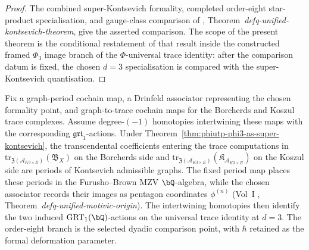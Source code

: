 \begin{proof}
The combined super-Kontsevich formality, completed order-eight
star-product specialisation, and gauge-class comparison of
\cite{VolI}, Theorem~\textit{defq-unified-kontsevich-theorem}, give
the asserted comparison. The scope of
the present theorem is the conditional restatement of that result inside
the constructed framed $\Phi_3$ image branch of the $\Phi$-universal trace
identity: after the comparison datum is fixed, the chosen $d = 3$
specialisation is compared with the super-Kontsevich quantisation.
\end{proof}

\begin{remark}
\label{rem:phiutp-motivic-phi3-trace}
Fix a graph-period cochain map, a Drinfeld associator representing the
chosen formality point, and graph-to-trace cochain maps for the
Borcherds and Koszul trace complexes.  Assume degree-$(-1)$ homotopies
intertwining these maps with the corresponding
$\mathfrak{grt}_1$-actions.  Under
Theorem~\ref{thm:phiutp-phi3-as-super-kontsevich}, the transcendental
coefficients entering the trace computations in
$\mathrm{tr}_{\mathfrak{Z}(\mathcal{A}_{K3\times E})}(\mathfrak{B}_X)$
on the Borcherds side and
$\mathrm{tr}_{\mathfrak{Z}(\mathcal{A}_{K3\times E})}(\mathfrak{K}_{\mathcal{A}_{K3\times E}})$
on the Koszul side are periods of Kontsevich admissible graphs.  The
fixed period map places these periods in the Furusho--Brown MZV
$\bQ$-algebra, while the chosen associator records their images as
pentagon coordinates $\phi^{(n)}$ (Vol~I \cite{VolI},
Theorem~\textit{defq-unified-motivic-origin}).  The intertwining
homotopies then identify the two induced $\mathrm{GRT}_1(\bQ)$-actions
on the universal trace identity at $d=3$.  The order-eight branch is
the selected dyadic comparison point, with $\hbar$ retained as the
formal deformation parameter.
\end{remark}

